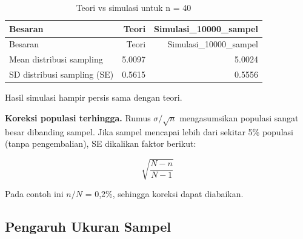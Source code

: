 \documentclass[
  indonesian,
  letterpaper,
]{book}
\begin{document}
\begin{longtable}[]{@{}lrr@{}}
\caption{Teori vs simulasi untuk n = 40}\tabularnewline
\toprule\noalign{}
Besaran & Teori & Simulasi\_10000\_sampel \\
\midrule\noalign{}
\endfirsthead
\toprule\noalign{}
Besaran & Teori & Simulasi\_10000\_sampel \\
\midrule\noalign{}
\endhead
\bottomrule\noalign{}
\endlastfoot
Mean distribusi sampling & 5.0097 & 5.0024 \\
SD distribusi sampling (SE) & 0.5615 & 0.5556 \\
\end{longtable}

Hasil simulasi hampir persis sama dengan teori.

\textbf{Koreksi populasi terhingga.} Rumus \(\sigma/\sqrt{n}\)
mengasumsikan populasi sangat besar dibanding sampel. Jika sampel
mencapai lebih dari sekitar 5\% populasi (tanpa pengembalian), SE
dikalikan faktor berikut:

\[
\sqrt{\frac{N-n}{N-1}}
\]

Pada contoh ini \(n/N\) = 0,2\%, sehingga koreksi dapat diabaikan.

\subsection{Pengaruh Ukuran Sampel}\label{pengaruh-ukuran-sampel}
\end{document}
